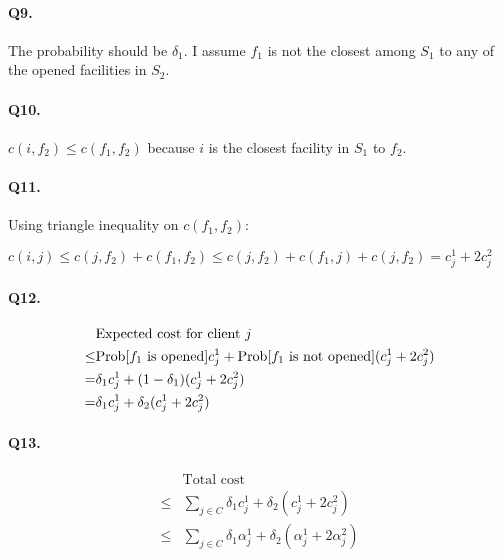 \documentclass{article}
\begin{document}
\paragraph{Q9. }

The probability should be $\delta_1$. 
I assume $f_1$ is not the closest among $S_1$ to any of the opened facilities in $S_2$. 

\paragraph{Q10. }

$c(i, f_2) \le c(f_1, f_2)$ because $i$ is the closest facility in $S_1$ to $f_2$. 

\paragraph{Q11. }

Using triangle inequality on $c(f_1, f_2)$:

$c(i, j) \le c(j, f_2) + c(f_1, f_2) \le c(j, f_2) + c(f_1, j) + c(j, f_2) = c_j^1 + 2 c_j^2$

\paragraph{Q12. }

\begin{align*}
  & \text{Expected cost for client}\ j \\
  \le& \text{Prob}[f_1 \text{ is opened}] c_j^1 + \text{Prob}[f_1 \text{ is not opened}] (c_j^1 + 2c_j^2) \\
  = & \delta_1 c_j^1 + (1-\delta_1) (c_j^1 + 2c_j^2) \\
  = & \delta_1 c_j^1 + \delta_2 (c_j^1 + 2c_j^2) 
\end{align*}


\paragraph{Q13. }

\begin{align*}  
  & \text{Total cost } \\
  \le & \sum_{j \in C} \delta_1 c_j^1 + \delta_2 (c_j^1 + 2c_j^2) \\
  \le & \sum_{j \in C} \delta_1 \alpha_j^1 + \delta_2 (\alpha_j^1 + 2 \alpha_j^2)
\end{align*}
\end{document}
